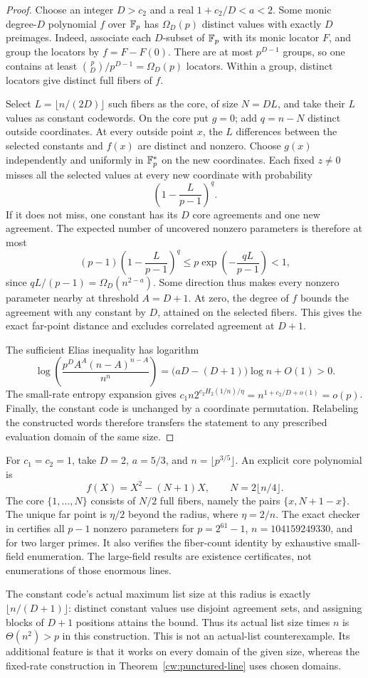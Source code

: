 \begin{proof}
Choose an integer $D>c_2$ and a real
$1+c_2/D<a<2$. Some monic degree-$D$ polynomial $f$ over $\mathbb F_p$
has $\Omega_D(p)$ distinct values with exactly $D$ preimages.
Indeed, associate each $D$-subset of $\mathbb F_p$ with its monic locator
$F$, and group the locators by $f=F-F(0)$. There are at most
$p^{D-1}$ groups, so one contains at least
$\binom pD/p^{D-1}=\Omega_D(p)$ locators.
Within a group, distinct locators give distinct full fibers of $f$.

Select $L=\lfloor n/(2D)\rfloor$ such fibers as the core, of size
$N=DL$, and take their $L$ values as constant codewords. On the core
put $g=0$; add $q=n-N$ distinct outside coordinates. At every outside
point $x$, the $L$ differences between the selected constants and
$f(x)$ are distinct and nonzero. Choose $g(x)$ independently and
uniformly in $\mathbb F_p^*$ on the new coordinates. Each fixed $z\ne0$
misses all the selected values at every new coordinate with probability
\[
 \left(1-\frac{L}{p-1}\right)^q.
\]
If it does not miss, one constant has its $D$ core agreements and
one new agreement. The expected number of uncovered nonzero parameters
is therefore at most
\[
 (p-1)\left(1-\frac L{p-1}\right)^q
 \le p\exp\!\left(-\frac{qL}{p-1}\right)<1,
\]
since $qL/(p-1)=\Omega_D(n^{2-a})$.
Some direction thus makes every nonzero parameter nearby at threshold
$A=D+1$. At zero, the degree of $f$ bounds the agreement with any
constant by $D$, attained on the selected fibers. This gives the exact
far-point distance and excludes correlated agreement at $D+1$.

The sufficient Elias inequality has logarithm
\[
 \log\!\left(\frac{p^D A^A(n-A)^{n-A}}{n^n}\right)
 =\bigl(aD-(D+1)\bigr)\log n+O(1)>0.
\]
The small-rate entropy expansion gives
$c_1n2^{c_2H_2(1/n)/\eta}=n^{1+c_2/D+o(1)}=o(p)$.
Finally, the constant code is unchanged by a coordinate permutation.
Relabeling the constructed words therefore transfers the statement
to any prescribed evaluation domain of the same size.
\end{proof}

For $c_1=c_2=1$, take $D=2$, $a=5/3$, and
$n=\lfloor p^{3/5}\rfloor$. An explicit core polynomial is
\[
 f(X)=X^2-(N+1)X,\qquad N=2\lfloor n/4\rfloor.
\]
The core $\{1,\ldots,N\}$ consists of $N/2$ full fibers,
namely the pairs $\{x,N+1-x\}$. The unique far point is $\eta/2$
beyond the radius, where $\eta=2/n$. The exact checker
 in
 certifies all $p-1$ nonzero parameters
for $p=2^{61}-1$, $n=104159249330$, and for two larger primes.
It also verifies the fiber-count identity by exhaustive small-field
enumeration. The large-field results are existence certificates, not
enumerations of those enormous lines.

The constant code's actual maximum list size at this radius is exactly
$\lfloor n/(D+1)\rfloor$: distinct constant values use disjoint agreement
sets, and assigning blocks of $D+1$ positions attains the bound.
Thus its actual list size times $n$ is $\Theta(n^2)>p$ in this
construction. This is not an actual-list counterexample. Its additional feature is
that it works on every domain of the given size, whereas the fixed-rate
construction in Theorem~\ref{cw:punctured-line} uses chosen domains.
